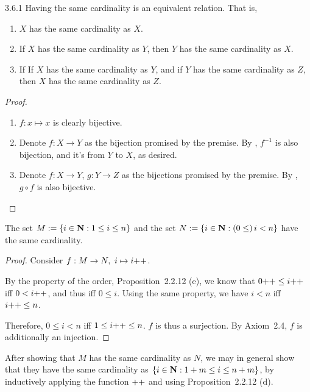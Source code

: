 \begin{exercise}{3.6.1}
	Having the same cardinality is an equivalent relation. That is,
	\begin{enumerate}
		\item {} $X$ has the same cardinality as $X$.
		\item {} If $X$ has the same cardinality as $Y$, then $Y$ has the same cardinality as $X$.
		\item {} If If $X$ has the same cardinality as $Y$, and if $Y$ has the same cardinality as $Z$, then $X$ has the same cardinality as $Z$.
	\end{enumerate}
\end{exercise}
\begin{proof}\leavevmode
	\begin{enumerate}
		\item $f: x \mapsto x$ is clearly bijective.
		\item Denote $f: X \to Y$ as the bijection promised by the premise. By , $f^{-1}$ is also bijection, and it's from $Y$ to $X$, as desired.
		\item Denote $f: X \to Y$, $g: Y \to Z$ as the bijections promised by the premise. By , $g \circ f$ is also bijective.
	\end{enumerate}
\end{proof}

\begin{why}{59} \label{why.shifting.not.change.cardi}
	The set $M := \{i \in \mathbf{N} : 1 \le i \le n\}$ and the set $N := \{i \in \mathbf{N} : (0 \le)\, i < n\}$ have the same cardinality.
\end{why}
\begin{proof}
	Consider $f: M \to N,\ i \mapsto i{+}{+}$. 
	
	By the property of the order, Proposition~2.2.12 (e), we know that $0{+}{+} \le i{+}{+}$ iff $0 < i{+}{+}$, and thus iff $0 \le i$. Using the same property, we have $i < n$ iff $i{+}{+} \le n$. 
	
	Therefore, $0 \le i < n$ iff $1 \le i{+}{+} \le n$. $f$ is thus a surjection. By Axiom~2.4, $f$ is additionally an injection. 
\end{proof}

After showing that $M$ has the same cardinality as $N$, we may in general show that they have the same cardinality as $\{i \in \mathbf{N} : 1+m \le i \le n+m\}$, by inductively applying the function ${+}{+}$ and using Proposition~2.2.12 (d).

